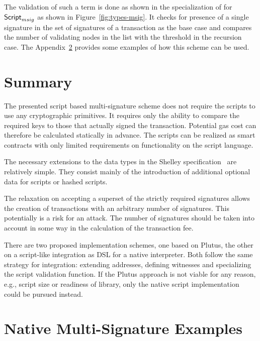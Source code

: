 \documentclass[11pt,a4paper,dvipsnames]{article}
\newcommand{\Script}{\type{Script}}
\newcommand{\ScriptMSig}{\Script_{msig}}
\theoremstyle{definition}
\begin{document}
The validation of such a term is done as shown in the specialization of
 for $\ScriptMSig$ as shown in Figure~\ref{fig:types-msig}.
It checks for presence of a single signature in the set of signatures of a
transaction as the base case and compares the number of validating nodes in the
list with the threshold in the recursion case. The
Appendix~\ref{sec:native-multi-sign} provides some examples of how this scheme
can be used.

\section{Summary}
\label{sec:summary}

The presented script based multi-signature scheme does not require the scripts
to use any cryptographic primitives. It requires only the ability to compare the
required keys to those that actually signed the transaction. Potential gas cost
can therefore be calculated statically in advance. The scripts can be realized
as smart contracts with only limited requirements on functionality on the script
language.

The necessary extensions to the data types in the Shelley
specification~\cite{shelley_formal_spec} are relatively simple. They consist
mainly of the introduction of additional optional data for scripts or hashed
scripts.

The relaxation on accepting a superset of the strictly required signatures
allows the creation of transactions with an arbitrary number of signatures. This
potentially is a risk for an attack. The number of signatures should be taken
into account in some way in the calculation of the transaction fee.

There are two proposed implementation schemes, one based on Plutus, the other on
a script-like integration as DSL for a native interpreter. Both follow the same
strategy for integration: extending addresses, defining witnesses and
specializing the script validation function. If the Plutus approach is not
viable for any reason, e.g., script size or readiness of library, only the
native script implementation could be pursued instead.

\appendix

\section{Native Multi-Signature Examples}
\label{sec:native-multi-sign}
\end{document}
